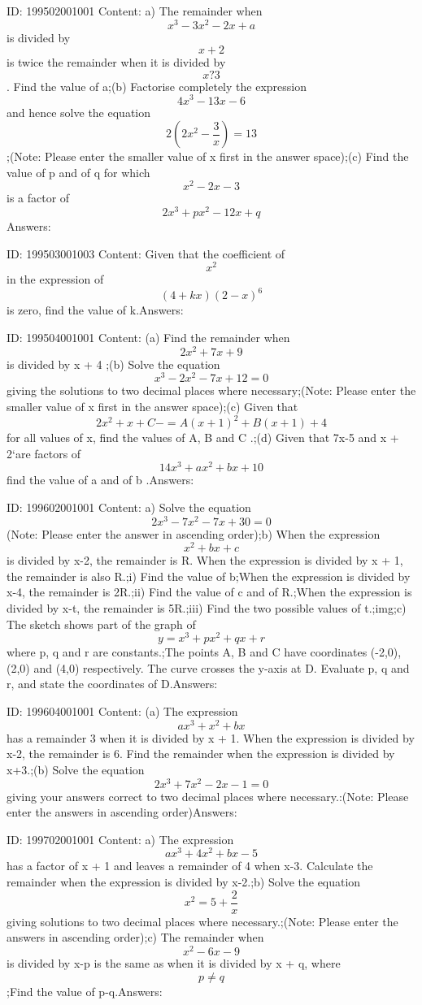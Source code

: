 \documentclass{article}
\begin{document}
ID: 199502001001
Content:
a) The remainder when \[x^{3}-3x^{2}-2x+a \] is divided by\[x + 2 \] is twice the remainder when it is divided by \[x ? 3\].  Find the value of a;(b) Factorise completely the expression \[4x^{3}-13x-6\]  and hence solve the equation \[2\left ( 2x^{2}-\frac{3}{x} \right )=13\];(Note: Please enter the smaller value of x first in the answer space);(c) Find the value of p and of q for which \[x^{2}-2x-3\]  is a factor of \[2x^{3}+px^{2}-12x+q\]Answers:

ID: 199503001003
Content:
Given that the coefficient of \[x^2 \]in the expression of \[(4+kx)(2-x)^6 \] is zero,  find the value of k.Answers:

ID: 199504001001
Content:
(a)	Find the remainder when \[2x^2+7x+9\] is divided by x + 4 ;(b)	Solve the equation \[x^3-2x^2-7x+12=0\] giving the solutions to two decimal places where necessary;(Note: Please enter the smaller value of x first in the answer space);(c)	Given that \[2x^2+x+C -= A(x+1)^2+B(x+1)+4 \] for all values of x, find the values of A, B and C .;(d)	Given that 7x-5 and x + 2`are factors of \[14x^3+ax^2+bx+10\] find the value of a and of b .Answers:

ID: 199602001001
Content:
a) Solve the equation \[2x^3-7x^2-7x+30=0\](Note: Please enter the answer in ascending order);b) When the expression \[x^2+bx+c\] is divided by x-2, the remainder is R. When the expression is divided by x + 1, the remainder is also R.;i)	Find the value of b;When the expression is divided by x-4, the remainder is 2R.;ii)	Find the value of c and of R.;When the expression is divided by x-t, the remainder is 5R.;iii)	Find the two possible values of t.;img;c) The sketch shows part of the graph of \[y=x^3+px^2+qx+r\] where p, q and r are constants.;The points A, B and C have coordinates (-2,0), (2,0) and (4,0) respectively. The curve crosses the y-axis at D. Evaluate p, q and r, and state the coordinates of D.Answers:

ID: 199604001001
Content:
(a) The expression \[ax^3+x^2+bx\] has a remainder 3 when it is divided by x + 1. When the expression is divided by x-2, the remainder is 6. Find the remainder when the expression is divided by x+3.;(b) Solve the equation \[2x^3+7x^2-2x-1=0\] giving your answers correct to two decimal places where necessary.:(Note: Please enter the answers in ascending order)Answers:

ID: 199702001001
Content:
a) The expression \[ax^3+4x^2+bx-5\] has a factor of x + 1 and leaves a remainder of 4 when x-3. Calculate the remainder when the expression is divided by x-2.;b) Solve the equation \[x^2=5+\frac{2}{x}\]  giving solutions to two decimal places where necessary.;(Note: Please enter the answers in ascending order);c) The remainder when \[x^2-6x-9\] is divided by x-p is the same as when it is divided by x + q, where \[p\neq q\];Find the value of p-q.Answers:
\end{document}
